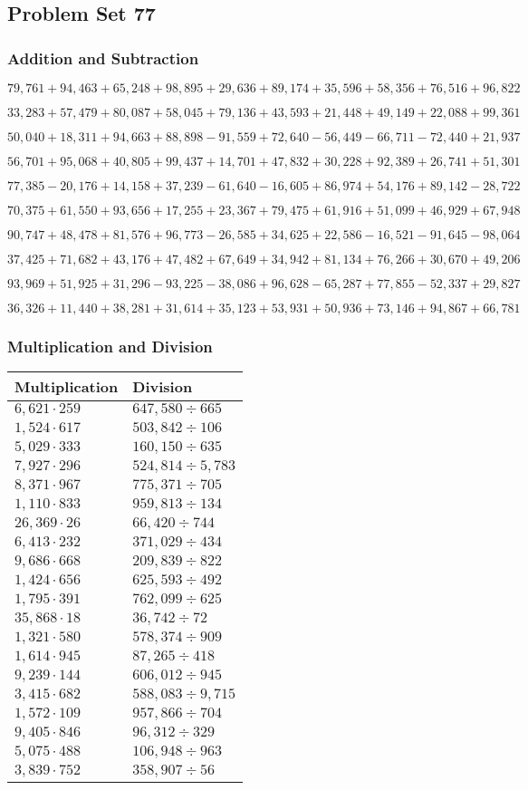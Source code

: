 \hypertarget{problem-set-77}{%
\subsection{Problem Set 77}\label{problem-set-77}}

\hypertarget{addition-and-subtraction-299}{%
\subsubsection{Addition and
Subtraction}\label{addition-and-subtraction-299}}

\(79,761+94,463+65,248+98,895+29,636+89,174+35,596+58,356+76,516+ 96,822\)

\(33,283+57,479+80,087+58,045+79,136+43,593+21,448+49,149+22,088+99,361\)

\(50,040+18,311+94,663+88,898-91,559+72,640-56,449-66,711-72,440+21,937\)

\(56,701+95,068+40,805+99,437+14,701+47,832+30,228+92,389+26,741+51,301\)

\(77,385-20,176+14,158+37,239-61,640-16,605+86,974+54,176+89,142-28,722\)

\(70,375+61,550+93,656+17,255+23,367+79,475+61,916+51,099+46,929+67,948\)

\(90,747+48,478+81,576+96,773-26,585+34,625+22,586-16,521-91,645-98,064\)

\(37,425+71,682+43,176+47,482+67,649+34,942+81,134+76,266+30,670+49,206\)

\(93,969+51,925+31,296-93,225-38,086+96,628-65,287+77,855-52,337+29,827\)

\(36,326+11,440+38,281+31,614+35,123+53,931+50,936+73,146+94,867+66,781\)

\hypertarget{multiplication-and-division-298}{%
\subsubsection{Multiplication and
Division}\label{multiplication-and-division-298}}

\begin{longtable}[]{@{}ll@{}}
\toprule
Multiplication & Division\tabularnewline
\midrule
\endhead
\(6,621\cdot259\) & \(647,580÷665\)\tabularnewline
\(1,524\cdot617\) & \(503,842÷106\)\tabularnewline
\(5,029\cdot333\) & \(160,150÷635\)\tabularnewline
\(7,927\cdot296\) & \(524,814÷5,783\)\tabularnewline
\(8,371\cdot967\) & \(775,371÷705\)\tabularnewline
\(1,110\cdot833\) & \(959,813÷134\)\tabularnewline
\(26,369\cdot26\) & \(66,420÷744\)\tabularnewline
\(6,413\cdot232\) & \(371,029÷434\)\tabularnewline
\(9,686\cdot668\) & \(209,839÷822\)\tabularnewline
\(1,424\cdot656\) & \(625,593÷492\)\tabularnewline
\(1,795\cdot391\) & \(762,099÷625\)\tabularnewline
\(35,868\cdot18\) & \(36,742÷72\)\tabularnewline
\(1,321\cdot580\) & \(578,374÷909\)\tabularnewline
\(1,614\cdot945\) & \(87,265÷418\)\tabularnewline
\(9,239\cdot144\) & \(606,012÷945\)\tabularnewline
\(3,415\cdot682\) & \(588,083÷9,715\)\tabularnewline
\(1,572\cdot109\) & \(957,866÷704\)\tabularnewline
\(9,405\cdot846\) & \(96,312÷329\)\tabularnewline
\(5,075\cdot488\) & \(106,948÷963\)\tabularnewline
\(3,839\cdot752\) & \(358,907÷56\)\tabularnewline
\bottomrule
\end{longtable}

